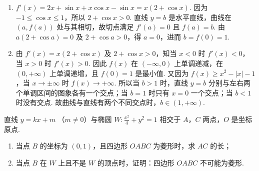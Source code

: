 \begin{solution}
\begin{enumerate}
\item \(f'(x)=2x+\sin x+x\cos x-\sin x=x(2+\cos x)\). 因为 \(-1\leqslant\cos x\leqslant1\)，所以 \(2+\cos x>0\). 直线 \(y=b\) 是水平直线，曲线在 \((a,f(a))\) 处与其相切，故切点满足 \(f'(a)=0\) 且 \(f(a)=b\). 由 \(a(2+\cos a)=0\) 及 \(2+\cos a>0\)，得 \(a=0\)，进而 \(b=f(0)=1\).
\item 由 \(f'(x)=x(2+\cos x)\) 及 \(2+\cos x>0\)，知当 \(x<0\) 时 \(f'(x)<0\)，当 \(x>0\) 时 \(f'(x)>0\). 因此 \(f(x)\) 在 \((-\infty,0)\) 上单调递减，在 \((0,+\infty)\) 上单调递增，且 \(f(0)=1\) 是最小值. 又因为 \(f(x)\geqslant x^2-|x|-1\)，当 \(x\to\pm\infty\) 时 \(f(x)\to+\infty\). 所以当 \(b>1\) 时，直线 \(y=b\) 分别与左右两个单调区间的图象各有一个交点；当 \(b=1\) 时只有 \(x=0\) 一个交点；当 \(b<1\) 时没有交点. 故曲线与直线有两个不同交点时，\(b\in(1,+\infty)\).
\end{enumerate}
\end{solution}

\begin{problem}
直线 \( y = kx + m  \) （\(m \neq 0\)）与椭圆 \( W: \frac{x^2}{4} + y^2 = 1 \) 相交于 \(A\)，\(C\) 两点，\(O\) 是坐标原点.
\begin{enumerate}
\item 当点 \(B\) 的坐标为 \((0,1)\)，且四边形 \(OABC\) 为菱形时，求 \(AC\) 的长；
\item 当点 \(B\) 在 \(W\) 上且不是 \(W\) 的顶点时，证明：四边形 \(OABC\) 不可能为菱形.
\end{enumerate}
\end{problem}

